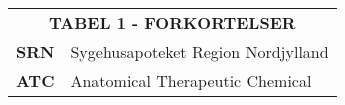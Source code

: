 \begin{table}[H]
\label{table:forkortelser}
\begin{tabular}{p{1.5cm} p{12.8cm}}
\multicolumn{2}{c}{\cellcolor[HTML]{C0C0C0}\textbf{TABEL 1 - FORKORTELSER}} \vspace{0.5cm} \\
\textbf{SRN} & Sygehusapoteket Region Nordjylland \vspace{0.5cm} \\
\textbf{ATC} & Anatomical Therapeutic Chemical \vspace{0.5cm} \\
\end{tabular}
\end{table}


